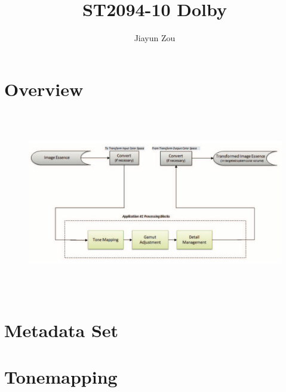 \documentclass{article}
\title{ST2094-10 Dolby}
\author{Jiayun Zou}
\date{}
\begin{document}
\maketitle
\thispagestyle{empty}
\newpage

\tableofcontents
\thispagestyle{empty}
\newpage

\setlength{\parindent}{2em}

\section{Overview}
\begin{figure}[h]
    \centering
    \includegraphics[width=15cm,height=8cm]{Figure1.png}
\end{figure}
\section{Metadata Set}

\section{Tonemapping}
\end{document}
